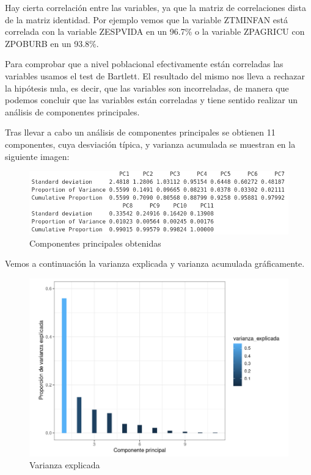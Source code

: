\documentclass[11pt,a4paper]{article}
\begin{document}
    Hay cierta correlación entre las variables, ya que la matriz de correlaciones dista de la matriz identidad. Por ejemplo vemos que la variable ZTMINFAN está correlada con la variable ZESPVIDA en un 96.7\% o la variable ZPAGRICU con ZPOBURB en un 93.8\%.  
    
    Para comprobar que a nivel poblacional efectivamente están correladas las variables usamos el test de Bartlett. El resultado del mismo nos lleva a rechazar la hipótesis nula, es decir, que las variables son incorreladas, de manera que podemos concluir que las variables están correladas y tiene sentido realizar un análisis de componentes principales. 
    
    Tras llevar a cabo un análisis de componentes principales se obtienen 11 componentes, cuya desviación típica, y varianza acumulada se muestran en la siguiente imagen:
    
        	\begin{figure}[H]
    	    \centering
    	    \includegraphics[scale=0.6]{componentes.png}
    	    \caption{Componentes principales obtenidas}
    	    \label{componentes}
    	\end{figure}
    Vemos a continuación la varianza explicada y varianza acumulada gráficamente. 
    
         	\begin{figure}[H]
    	    \centering
    	    \includegraphics[scale=0.5]{varexp.png}
    	    \caption{Varianza explicada}
    	    \label{varexp}
    	\end{figure}
    	
\end{document}
